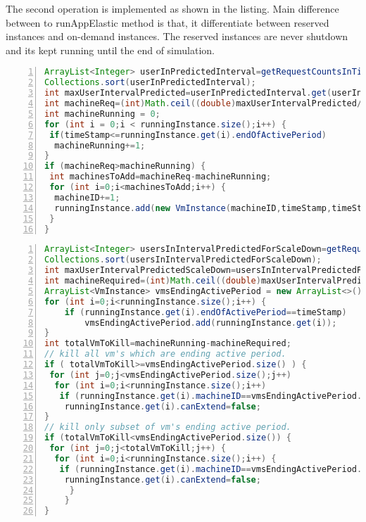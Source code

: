 The second operation is implemented as shown in the listing. Main difference between to runAppElastic method is that, it differentiate between reserved instances and on-demand instances. The reserved instances are never shutdown and its kept running until the end of simulation.
\begin{lstlisting}[language=java,caption=AppElastic Scaleup,label=list:appelasticscaleup,numbers=left,frame=single,fontadjust=true,breaklines,basicstyle=\small]
ArrayList<Integer> userInPredictedInterval=getRequestCountsInTimeRange(timeStamp, timeStamp + scaleUpLookAhead,false);
Collections.sort(userInPredictedInterval);
int maxUserIntervalPredicted=userInPredictedInterval.get(userInPredictedInterval.size() - 1);
int machineReq=(int)Math.ceil((double)maxUserIntervalPredicted/numberOfUserPerInstance);
int machineRunning = 0;
for (int i = 0;i < runningInstance.size();i++) {
 if(timeStamp<=runningInstance.get(i).endOfActivePeriod)
  machineRunning+=1;
}
if (machineReq>machineRunning) {
 int machinesToAdd=machineReq-machineRunning;
 for (int i=0;i<machinesToAdd;i++) {
  machineID+=1;
  runningInstance.add(new VmInstance(machineID,timeStamp,timeStamp+billingPeriod,timeStamp+timeTakenToActive, (timeStamp+billingPeriod)-timetakenToShutdown));
 }
}
\end{lstlisting}
\begin{lstlisting}[language=java,caption=AppElastic Scaledown,label=list:appelasticscaledown,numbers=left,frame=single,fontadjust=true,breaklines,basicstyle=\small]
ArrayList<Integer> usersInIntervalPredictedForScaleDown=getRequestCountsInTimeRange(timeStamp,timeStamp+ scaleDownLookAhead,true);
Collections.sort(usersInIntervalPredictedForScaleDown);
int maxUserIntervalPredictedScaleDown=usersInIntervalPredictedForScaleDown.get(usersInIntervalPredictedForScaleDown.size()-1);
int machineRequired=(int)Math.ceil((double)maxUserIntervalPredictedScaleDown/numberOfUserPerInstance);
ArrayList<VmInstance> vmsEndingActivePeriod = new ArrayList<>();
for (int i=0;i<runningInstance.size();i++) {
	if (runningInstance.get(i).endOfActivePeriod==timeStamp)
		vmsEndingActivePeriod.add(runningInstance.get(i));
}
int totalVmToKill=machineRunning-machineRequired;
// kill all vm's which are ending active period.
if ( totalVmToKill>=vmsEndingActivePeriod.size() ) {
 for (int j=0;j<vmsEndingActivePeriod.size();j++)
  for (int i=0;i<runningInstance.size();i++)
   if (runningInstance.get(i).machineID==vmsEndingActivePeriod.get(j).machineID)
    runningInstance.get(i).canExtend=false;
}
// kill only subset of vm's ending active period.
if (totalVmToKill<vmsEndingActivePeriod.size()) {
 for (int j=0;j<totalVmToKill;j++) {
  for (int i=0;i<runningInstance.size();i++) {
   if (runningInstance.get(i).machineID==vmsEndingActivePeriod.get(j).machineID)
    runningInstance.get(i).canExtend=false;
	 }
	}
}
\end{lstlisting}
